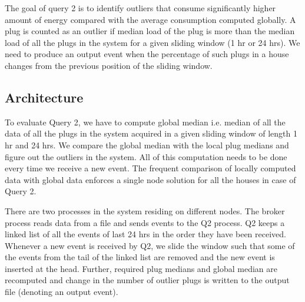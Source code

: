 The goal of query 2 is to identify outliers that consume significantly higher amount of energy compared with the average consumption computed globally.
A plug is counted as an outlier if median load of the plug is more than the median load of all the plugs in the system for a given sliding window (1 hr or 24 hrs).
We need to produce an output event when the percentage of such plugs in a house changes from the previous position of the sliding window.


\subsection{Architecture}
To evaluate Query 2, we have to compute global median i.e.
median of all the data of all the plugs in the system acquired in a given sliding window of length 1 hr and 24 hrs.
We compare the global median with the local plug medians and figure out the outliers in the system.
All of this computation needs to be done every time we receive a new event.
The frequent comparison of locally computed data with global data enforces a single node solution for all the houses in case of Query 2.

There are two processes in the system residing on different nodes.
The broker process reads data from a file and sends events to the Q2 process.
Q2 keeps a linked list of all the events of last 24 hrs in the order they have been received.
Whenever a new event is received by Q2, we slide the window such that some of the events from the tail of the linked list are removed and the new event is inserted at the head.
Further, required plug medians and global median are recomputed and change in the number of outlier plugs is written to the output file (denoting an output event).

